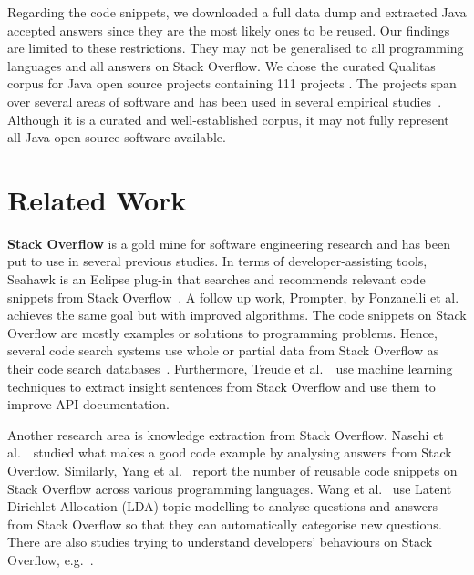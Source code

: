 \documentclass[10pt,journal,compsoc]{IEEEtran}
\begin{document}
Regarding the code snippets, we downloaded a full data dump and
extracted Java accepted answers
since they are the
most likely ones to be reused. 
Our findings are limited to these restrictions. They may
not be generalised to all programming languages and all answers on
Stack Overflow. We chose the curated Qualitas
corpus for Java open source projects containing 111 projects
\cite{QualitasCorpus}.  The projects span over several areas of
software and has been used in several empirical
studies~\cite{Taube-Schock2011,Beckman2011,Vasilescu2011,Omar2012}. Although
it is a curated and well-established corpus, it may not fully
represent all Java open source software available.


\section{Related Work}

\textbf{Stack Overflow} is a gold mine for software engineering
research and
has been put to
use in several previous studies. In terms of developer-assisting
tools, Seahawk is an Eclipse plug-in that searches and recommends
relevant code snippets from Stack Overflow~\cite{Ponzanelli2013}. A
follow up work, Prompter, by Ponzanelli et al.~\cite{Ponzanelli2014}
achieves the same goal but with improved algorithms. The code snippets
on Stack Overflow are mostly examples or solutions to programming
problems. Hence, several code search systems use whole or partial data
from Stack Overflow as their code search
databases~\cite{Keivanloo2014,Park2014,
	Stolee2014,Subramanian2013,Diamantopoulos2015}. Furthermore, Treude
et al.~\cite{Treude2016}~use machine learning techniques to extract
insight sentences from Stack Overflow and use them to improve API
documentation.

Another research area is knowledge extraction from Stack
Overflow. Nasehi et al.~\cite{Nasehi2012}~studied what makes a good
code example by analysing answers from Stack Overflow. Similarly, Yang
et al.~\cite{Yang2016} report the number of reusable code snippets on
Stack Overflow across various programming languages. Wang et
al.~\cite{Wang2013_StackOverflow} use Latent Dirichlet Allocation
(LDA) topic modelling to analyse questions and answers from Stack
Overflow so that they can automatically categorise new
questions. There are also studies trying to understand developers'
behaviours on Stack Overflow,
e.g.~\cite{Movshovitz-Attias2013,Rosen2016,Choetkiertikul2015,Bosu2013}.
\end{document}
